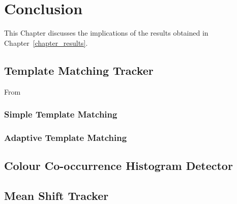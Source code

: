 \chapter{Conclusion}
This Chapter discusses the implications of the results obtained in
Chapter~\ref{chapter_results}. 

\section{Template Matching Tracker}
From


\subsection{Simple Template Matching}

\subsection{Adaptive Template Matching}


\section{Colour Co-occurrence Histogram Detector}


\section{Mean Shift Tracker}

